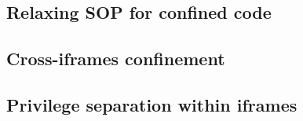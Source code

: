 \subsection{Relaxing SOP for confined code}
\label{sec:system:mashup}

\subsection{Cross-iframes confinement}
\label{sec:system:iframe}

\subsection{Privilege separation within iframes}
\label{sec:system:script}
